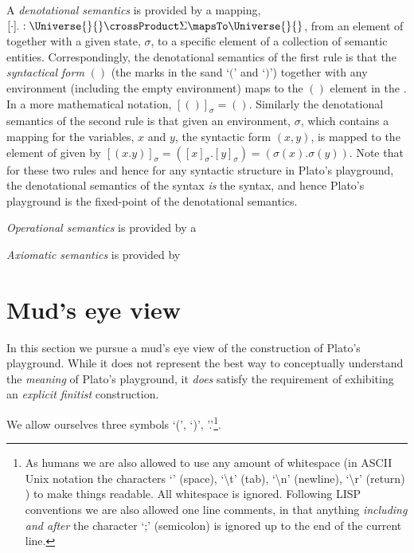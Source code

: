 A \emph{denotational semantics} is provided by a mapping, $[ \cdot ]_{\cdot} :
\Universe{}{} \crossProduct \Sigma \mapsTo \Universe{}{}$, from an element of
\Universe{}{} together with a given state, $\sigma$, to a specific element of a
collection of semantic entities. Correspondingly, the denotational semantics of
the first rule is that the \emph{syntactical form} $()$ (the marks in the sand
`$($' and `$)$') together with any environment (including the empty environment)
maps to the $()$ element in the \Universe{}{}. In a more mathematical notation,
$[()]_{\sigma} = ()$. Similarly the denotational semantics of the second rule is
that given an environment, $\sigma$, which contains a mapping for the variables,
$x$ and $y$, the syntactic form $(x , y)$, is mapped to the element of
\Universe{}{} given by $[ ( x . y ) ]_{\sigma} = ( [x]_{\sigma} . [y]_{\sigma} )
= ( \sigma(x) . \sigma(y) )$. Note that for these two rules and hence for any
syntactic structure in Plato's playground, the denotational semantics of the
syntax \emph{is} the syntax, and hence Plato's playground is the fixed-point of
the denotational semantics.

\emph{Operational semantics} is provided by a 

\emph{Axiomatic semantics} is provided by

\section{Mud's eye view}

In this section we pursue a mud's eye view of the construction of Plato's
playground. While it does not represent the best way to conceptually understand
the \emph{meaning} of Plato's playground, it \emph{does} satisfy the requirement
of exhibiting an \emph{explicit finitist} construction.

We allow ourselves three symbols `(', `)', '.'\footnote{As humans we are also allowed to use any amount of whitespace (in ASCII Unix notation the characters `\textvisiblespace' (space), `\textbackslash t' (tab), `\textbackslash n' (newline), `\textbackslash r' (return) ) to make things readable. All whitespace is ignored. Following LISP conventions we are also allowed one line comments, in that anything \emph{including and after} the character `;' (semicolon) is ignored up to the end of the current line.}.

